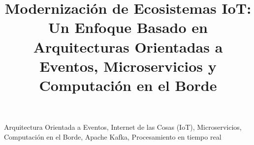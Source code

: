 \documentclass[conference]{IEEEtran}
\begin{document}
\title{Modernización de Ecosistemas IoT: Un Enfoque Basado en Arquitecturas Orientadas a Eventos, Microservicios y Computación en el Borde}

\author{
}

\maketitle

\begin{abstract}

\end{abstract}

\begin{IEEEkeywords}
Arquitectura Orientada a Eventos, Internet de las Cosas (IoT), Microservicios, Computación en el Borde, Apache Kafka, Procesamiento en tiempo real
\end{IEEEkeywords}










\printbibliography
\end{document}
